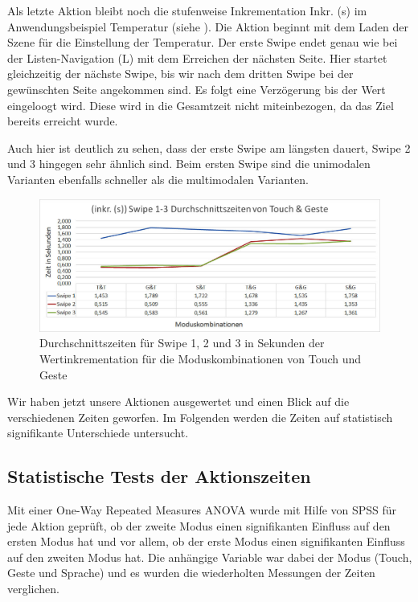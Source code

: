 Als letzte Aktion bleibt noch die stufenweise Inkrementation Inkr. (s) im Anwendungsbeispiel Temperatur (siehe ). 
Die Aktion beginnt mit dem Laden der Szene für die Einstellung der Temperatur. 
Der erste Swipe endet genau wie bei der Listen-Navigation (L) mit dem Erreichen der nächsten Seite. 
Hier startet gleichzeitig der nächste Swipe, bis wir nach dem dritten Swipe bei der gewünschten Seite angekommen sind. 
Es folgt eine Verzögerung bis der Wert eingeloogt wird. 
Diese wird in die Gesamtzeit nicht miteinbezogen, da das Ziel bereits erreicht wurde. 

Auch hier ist deutlich zu sehen, dass der erste Swipe am längsten dauert, Swipe 2 und 3 hingegen sehr ähnlich sind. 
Beim ersten Swipe sind die unimodalen Varianten ebenfalls schneller als die multimodalen Varianten.
\begin{figure}[ht]
  \centering
  \includegraphics[width=1\textwidth]{img/Swipe1-3_Klima.JPG}
  \caption[Durchschnittszeiten für Inkr. (s)]{Durchschnittszeiten für Swipe 1, 2 und 3 in Sekunden der Wertinkrementation für die Moduskombinationen von Touch und Geste}
  \label{fig:SwipeKlima}
\end{figure} 

Wir haben jetzt unsere Aktionen ausgewertet und einen Blick auf die verschiedenen Zeiten geworfen.
Im Folgenden werden die Zeiten auf statistisch signifikante Unterschiede untersucht. 

\subsection[Statistische Tests]{Statistische Tests der Aktionszeiten}
Mit einer One-Way Repeated Measures ANOVA wurde mit Hilfe von SPSS für jede Aktion geprüft, ob der zweite Modus einen signifikanten Einfluss auf den ersten Modus hat und vor allem, ob der erste Modus einen signifikanten Einfluss auf den zweiten Modus hat. 
Die anhängige Variable war dabei der Modus (Touch, Geste und Sprache) und es wurden die wiederholten Messungen der Zeiten verglichen. 

